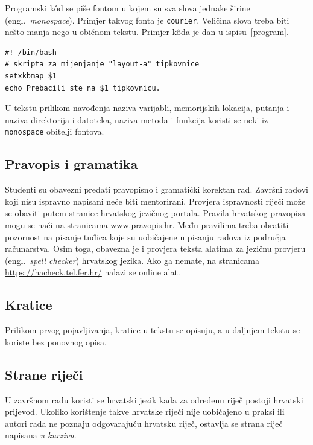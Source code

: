 Programski k\^od se piše fontom u kojem su sva slova jednake širine (engl.~\textit{monospace}). Primjer takvog fonta je \texttt{courier}. %
Veličina slova treba biti nešto manja nego u običnom tekstu. Primjer k\^oda je dan u ispisu~\ref{program}.
%

\begin{lstlisting}[caption={Skripta za mijenjanje rasporeda tipki tipkovnice}, label=program]
#! /bin/bash
# skripta za mijenjanje "layout-a" tipkovnice
setxkbmap $1
echo Prebacili ste na $1 tipkovnicu.
\end{lstlisting}

U tekstu prilikom navođenja naziva varijabli, memorijskih lokacija, putanja i naziva direktorija i datoteka, naziva metoda i funkcija koristi se neki iz \texttt{monospace} obitelji fontova.
\subsection{Pravopis i gramatika}

Studenti su obavezni predati pravopisno i gramatički korektan rad. Završni radovi koji nisu ispravno napisani neće biti mentorirani. Provjera ispravnosti riječi može se obaviti putem stranice \href{http://hjp.znanje.hr/}{hrvatskog jezičnog portala}. Pravila hrvatskog pravopisa mogu se naći na stranicama \href{www.pravopis.hr}{www.pravopis.hr}. Među pravilima treba obratiti pozornost na pisanje tuđica koje su uobičajene u pisanju radova iz područja računarstva. Osim toga, obavezna je i provjera teksta alatima za jezičnu provjeru (engl.~\textit{spell checker}) hrvatskog jezika. Ako ga nemate, na stranicama \url{https://hacheck.tel.fer.hr/} nalazi se online alat.
\subsection{Kratice}

Prilikom prvog pojavljivanja, kratice u tekstu se opisuju, a u daljnjem tekstu se koriste bez ponovnog opisa. 
\subsection{Strane riječi}
U završnom radu koristi se hrvatski jezik kada za određenu riječ postoji hrvatski prijevod. Ukoliko korištenje takve hrvatske riječi nije 
uobičajeno u praksi ili autori rada ne 
poznaju odgovarajuću hrvatsku riječ, ostavlja se strana riječ napisana \textit{u kurzivu}.

